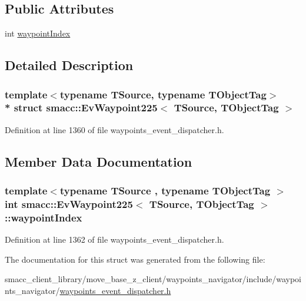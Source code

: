 \subsection*{Public Attributes}
\begin{DoxyCompactItemize}
\item 
int \hyperlink{structsmacc_1_1EvWaypoint225_aa96f6e4d04b4f9ddd6499c434457bd63}{waypoint\+Index}
\end{DoxyCompactItemize}


\subsection{Detailed Description}
\subsubsection*{template$<$typename T\+Source, typename T\+Object\+Tag$>$\\*
struct smacc\+::\+Ev\+Waypoint225$<$ T\+Source, T\+Object\+Tag $>$}



Definition at line 1360 of file waypoints\+\_\+event\+\_\+dispatcher.\+h.



\subsection{Member Data Documentation}
\subsubsection[{\texorpdfstring{waypoint\+Index}{waypointIndex}}]{\setlength{\rightskip}{0pt plus 5cm}template$<$typename T\+Source , typename T\+Object\+Tag $>$ int {\bf smacc\+::\+Ev\+Waypoint225}$<$ T\+Source, T\+Object\+Tag $>$\+::waypoint\+Index}\hypertarget{structsmacc_1_1EvWaypoint225_aa96f6e4d04b4f9ddd6499c434457bd63}{}\label{structsmacc_1_1EvWaypoint225_aa96f6e4d04b4f9ddd6499c434457bd63}


Definition at line 1362 of file waypoints\+\_\+event\+\_\+dispatcher.\+h.



The documentation for this struct was generated from the following file\+:\begin{DoxyCompactItemize}
\item 
smacc\+\_\+client\+\_\+library/move\+\_\+base\+\_\+z\+\_\+client/waypoints\+\_\+navigator/include/waypoints\+\_\+navigator/\hyperlink{waypoints__event__dispatcher_8h}{waypoints\+\_\+event\+\_\+dispatcher.\+h}\end{DoxyCompactItemize}
